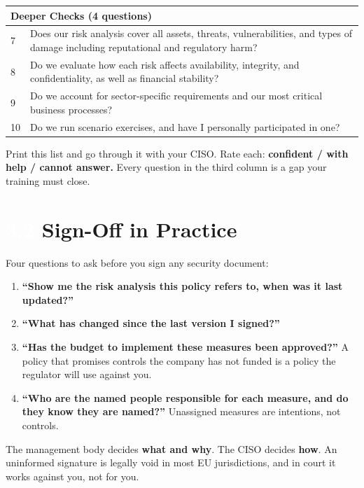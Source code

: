 \documentclass[11pt,a4paper,twoside]{book}
\newcommand{\lessontag}[1]{%
  \texorpdfstring{%
    \setlength{\fboxsep}{3pt}\colorbox{nisd2blue}{\textcolor{white}{\footnotesize\bfseries #1}}\quad%
  }{Lesson #1\ }%
}
\begin{document}
\begin{center}
\begin{tabular}{@{}p{0.3cm}p{10.5cm}@{}}
\midrule
\multicolumn{2}{l}{\textbf{Deeper Checks (4 questions)}} \\
\midrule
7 & Does our risk analysis cover all assets, threats, vulnerabilities, and types of damage  including reputational and regulatory harm? \\
8 & Do we evaluate how each risk affects availability, integrity, and confidentiality, as well as financial stability? \\
9 & Do we account for sector-specific requirements and our most critical business processes? \\
10 & Do we run scenario exercises, and have I personally participated in one? \\
\bottomrule
\end{tabular}
\end{center}

\begin{actionbox}
Print this list and go through it with your CISO. Rate each: \textbf{confident / with help / cannot answer.} Every question in the third column is a gap your training must close.
\end{actionbox}

\section{\lessontag{3.2}Sign-Off in Practice}

Four questions to ask before you sign any security document:

\begin{enumerate}
  \item \textbf{``Show me the risk analysis this policy refers to, when was it last updated?''}
  \item \textbf{``What has changed since the last version I signed?''}
  \item \textbf{``Has the budget to implement these measures been approved?''} A policy that promises controls the company has not funded is a policy the regulator will use against you.
  \item \textbf{``Who are the named people responsible for each measure, and do they know they are named?''} Unassigned measures are intentions, not controls.
\end{enumerate}

The management body decides \textbf{what and why}. The CISO decides \textbf{how}. An uninformed signature is legally void in most EU jurisdictions, and in court it works against you, not for you.
\end{document}

